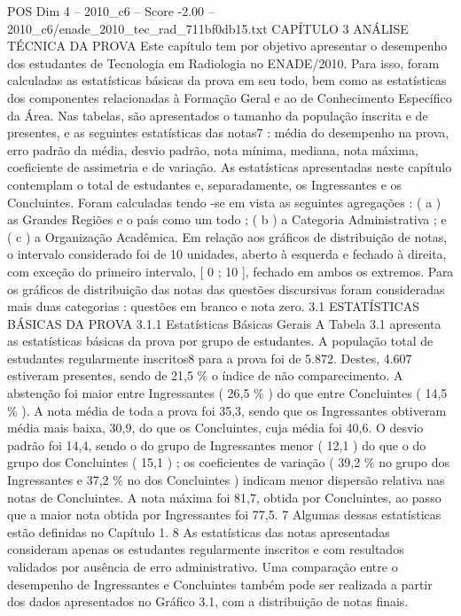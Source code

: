 \begin{textsample}{POS Dim 4 – 2010\_c6 – Score -2.00 – 2010\_c6/enade\_2010\_tec\_rad\_711bf0db15.txt}  \label{ex:f4_pos_318}
CAPÍTULO 3 ANÁLISE TÉCNICA DA PROVA Este capítulo tem por objetivo apresentar o desempenho dos estudantes de Tecnologia em Radiologia no ENADE/2010.
Para isso, foram calculadas as estatísticas básicas da prova em seu todo, bem como as estatísticas dos componentes relacionadas à Formação Geral e ao de Conhecimento Específico da Área.
Nas tabelas, são apresentados o tamanho da população inscrita e de presentes, e as seguintes estatísticas das notas7 : média do desempenho na prova, erro padrão da média, desvio padrão, nota mínima, mediana, nota máxima, coeficiente de assimetria e de variação.
As estatísticas apresentadas neste capítulo contemplam o total de estudantes e, separadamente, os Ingressantes e os Concluintes.
Foram calculadas tendo -se em vista as seguintes agregações : ( a ) as Grandes Regiões e o país como um todo ; ( b ) a Categoria Administrativa ; e ( c ) a Organização Acadêmica.
Em relação aos gráficos de distribuição de notas, o intervalo considerado foi de 10 unidades, aberto à esquerda e fechado à direita, com exceção do primeiro intervalo, [ 0 ; 10 ], fechado em ambos os extremos.
Para os gráficos de distribuição das notas das questões discursivas foram consideradas mais duas categorias : questões em branco e nota zero. 3.1 ESTATÍSTICAS BÁSICAS DA PROVA 3.1.1 Estatísticas Básicas Gerais A Tabela 3.1 apresenta as estatísticas básicas da prova por grupo de estudantes.
A população total de estudantes regularmente inscritos8 para a prova foi de 5.872.
Destes, 4.607 estiveram presentes, sendo de 21,5 \% o índice de não comparecimento.
A abstenção foi maior entre Ingressantes ( 26,5 \% ) do que entre Concluintes ( 14,5 \% ).
A nota média de toda a prova foi 35,3, sendo que os Ingressantes obtiveram média mais baixa, 30,9, do que os Concluintes, cuja média foi 40,6.
O desvio padrão foi 14,4, sendo o do grupo de Ingressantes menor ( 12,1 ) do que o do grupo dos Concluintes ( 15,1 ) ; os coeficientes de variação ( 39,2 \% no grupo dos Ingressantes e 37,2 \% no dos Concluintes ) indicam menor dispersão relativa nas notas de Concluintes.
A nota máxima foi 81,7, obtida por Concluintes, ao passo que a maior nota obtida por Ingressantes foi 77,5. 7 Algumas dessas estatísticas estão definidas no Capítulo 1. 8 As estatísticas das notas apresentadas consideram apenas os estudantes regularmente inscritos e com resultados validados por ausência de erro administrativo.
Uma comparação entre o desempenho de Ingressantes e Concluintes também pode ser realizada a partir dos dados apresentados no Gráfico 3.1, com a distribuição de notas finais.

\end{textsample}
